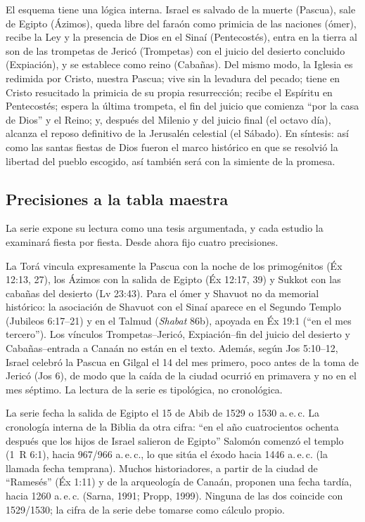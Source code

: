 \documentclass[11pt,letterpaper]{article}
\begin{document}
El esquema tiene una lógica interna. Israel es salvado de la muerte (Pascua), sale de Egipto (Ázimos), queda libre del faraón como primicia de las naciones (ómer), recibe la Ley y la presencia de Dios en el Sinaí (Pentecostés), entra en la tierra al son de las trompetas de Jericó (Trompetas) con el juicio del desierto concluido (Expiación), y se establece como reino (Cabañas). Del mismo modo, la Iglesia es redimida por Cristo, nuestra Pascua; vive sin la levadura del pecado; tiene en Cristo resucitado la primicia de su propia resurrección; recibe el Espíritu en Pentecostés; espera la última trompeta, el fin del juicio que comienza ``por la casa de Dios'' y el Reino; y, después del Milenio y del juicio final (el octavo día), alcanza el reposo definitivo de la Jerusalén celestial (el Sábado). En síntesis: así como las santas fiestas de Dios fueron el marco histórico en que se resolvió la libertad del pueblo escogido, así también será con la simiente de la promesa.

\subsection{Precisiones a la tabla maestra}
La serie expone su lectura como una tesis argumentada, y cada estudio la examinará fiesta por fiesta. Desde ahora fijo cuatro precisiones.

\begin{nota}
La Torá vincula expresamente la Pascua con la noche de los primogénitos (Éx 12:13, 27), los Ázimos con la salida de Egipto (Éx 12:17, 39) y Sukkot con las cabañas del desierto (Lv 23:43). Para el ómer y Shavuot no da memorial histórico: la asociación de Shavuot con el Sinaí aparece en el Segundo Templo (Jubileos 6:17--21) y en el Talmud (\emph{Shabat} 86b), apoyada en Éx 19:1 (``en el mes tercero''). Los vínculos Trompetas--Jericó, Expiación--fin del juicio del desierto y Cabañas--entrada a Canaán no están en el texto. Además, según Jos 5:10--12, Israel celebró la Pascua en Gilgal el 14 del mes primero, poco antes de la toma de Jericó (Jos 6), de modo que la caída de la ciudad ocurrió en primavera y no en el mes séptimo. La lectura de la serie es tipológica, no cronológica.
\end{nota}

\begin{nota}
La serie fecha la salida de Egipto el 15 de Abib de 1529 o 1530 a.\,e.\,c. La cronología interna de la Biblia da otra cifra: ``en el año cuatrocientos ochenta después que los hijos de Israel salieron de Egipto'' Salomón comenzó el templo (1~R 6:1), hacia 967/966 a.\,e.\,c., lo que sitúa el éxodo hacia 1446 a.\,e.\,c. (la llamada fecha temprana). Muchos historiadores, a partir de la ciudad de ``Ramesés'' (Éx 1:11) y de la arqueología de Canaán, proponen una fecha tardía, hacia 1260 a.\,e.\,c. (Sarna, 1991; Propp, 1999). Ninguna de las dos coincide con 1529/1530; la cifra de la serie debe tomarse como cálculo propio.
\end{nota}
\end{document}

